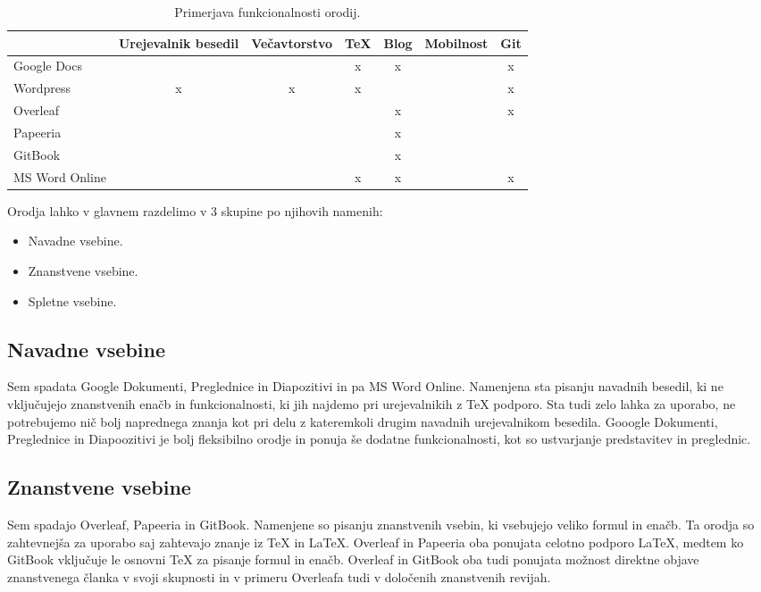 \documentclass[a4paper, 12pt]{book}
\begin{document}
\begin{table}[h]
	\begin{center}
		\begin{tabular}{ | l | c | c |c | c | c | c |}
			\hline
			& Urejevalnik besedil & Večavtorstvo & TeX & Blog & Mobilnost & Git  \\ \hline
			Google Docs & \checkmark & \checkmark & x & x & \checkmark & x  \\
			Wordpress & x & x & x & \checkmark & \checkmark & x \\
			Overleaf & \checkmark & \checkmark & \checkmark & x & \checkmark & x \\
			Papeeria & \checkmark & \checkmark & \checkmark & x & \checkmark & \checkmark \\
			GitBook & \checkmark & \checkmark & \checkmark & x & \checkmark & \checkmark \\
			MS Word Online & \checkmark & \checkmark & x & x & \checkmark & x \\	 
			\hline
		\end{tabular}
	\end{center} 
	\caption{Primerjava funkcionalnosti orodij.}
	\label{tbl:orodja}
\end{table}

Orodja lahko v glavnem razdelimo v 3 skupine po njihovih namenih:
\begin{itemize}
	\item Navadne vsebine.
	\item Znanstvene vsebine.
	\item Spletne vsebine.
\end{itemize}

\subsection{Navadne vsebine}
Sem spadata Google Dokumenti, Preglednice in Diapozitivi in pa MS Word Online. Namenjena sta pisanju navadnih besedil, ki ne vključujejo znanstvenih enačb in funkcionalnosti, ki jih najdemo pri urejevalnikih z TeX podporo. Sta tudi zelo lahka za uporabo, ne potrebujemo nič bolj naprednega znanja kot pri delu z kateremkoli drugim navadnih urejevalnikom besedila. Gooogle Dokumenti, Preglednice in Diapoozitivi je bolj fleksibilno orodje in ponuja še dodatne funkcionalnosti, kot so ustvarjanje predstavitev in preglednic. 

\subsection{Znanstvene vsebine}
Sem spadajo Overleaf, Papeeria in GitBook. Namenjene so pisanju	znanstvenih vsebin, ki vsebujejo veliko formul in enačb. Ta orodja so zahtevnejša za uporabo saj zahtevajo znanje iz TeX in LaTeX. Overleaf in Papeeria oba ponujata celotno podporo LaTeX, medtem ko GitBook vključuje le osnovni TeX za pisanje formul in enačb. Overleaf in GitBook oba tudi ponujata možnost direktne objave znanstvenega članka v svoji skupnosti in v primeru Overleafa tudi v določenih znanstvenih revijah.
\end{document}
